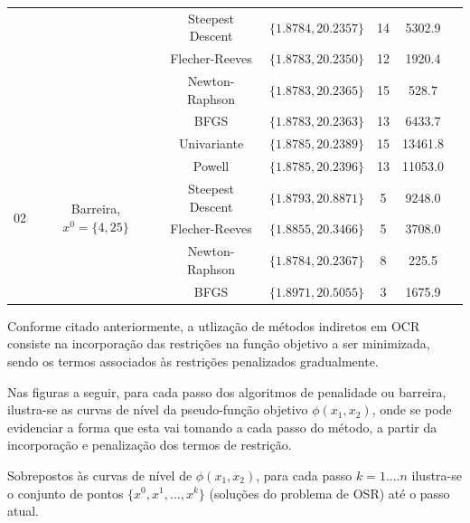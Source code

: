 \documentclass[10pt, a4paper]{article}
\begin{document}
\begin{table}[H]
\begin{tabular}{c|c|c|c|c|c|c}
                                                            & & Steepest Descent  & $\{1.8784,20.2357\}$ & 14 & 5302.9  \\
                                                            & & Flecher-Reeves    & $\{1.8783,20.2350\}$ & 12 & 1920.4  \\
                                                            & & Newton-Raphson    & $\{1.8783,20.2365\}$ & 15 & 528.7   \\
                                                            & & BFGS              & $\{1.8783,20.2363\}$ & 13 & 6433.7  \\
            \hline
            \multirow{6}{*}{02} & \multirow{6}{*}{Barreira, $x^0=\{4,25\}$} & Univariante         & $\{1.8785,20.2389\}$ & 15 & 13461.8 \\
                                                            & & Powell            & $\{1.8785,20.2396\}$ & 13 & 11053.0 \\
                                                            & & Steepest Descent  & $\{1.8793,20.8871\}$ & 5  & 9248.0  \\
                                                            & & Flecher-Reeves    & $\{1.8855,20.3466\}$ & 5  & 3708.0  \\
                                                            & & Newton-Raphson    & $\{1.8784,20.2367\}$ & 8  & 225.5   \\
                                                            & & BFGS              & $\{1.8971,20.5055\}$ & 3  & 1675.9  \\
            \hline
      \end{tabular}
      \label{table:results}
\end{table}

\newpage

Conforme citado anteriormente, a utliza\c c\~ao de m\'etodos indiretos em OCR consiste na incorpora\c c\~ao das restri\c c\~oes na fun\c c\~ao objetivo a ser minimizada, sendo os termos associados \`as restri\c c\~oes penalizados gradualmente.

Nas figuras a seguir, para cada passo dos algoritmos de penalidade ou barreira, ilustra-se as curvas de n\'ivel da pseudo-fun\c c\~ao objetivo $\phi(x_1, x_2)$, onde se pode evidenciar a forma que esta vai tomando a cada passo do m\'etodo, a partir da incorpora\c c\~ao e penaliza\c c\~ao dos termos de restri\c c\~ao.

Sobrepostos \`as curvas de n\'ivel de $\phi(x_1, x_2)$, para cada passo $k=1....n$ ilustra-se o conjunto de pontos $\{x^0, x^1, ... , x^k\}$ (solu\c c\~oes do problema de OSR) at\'e o passo atual.
\end{document}
